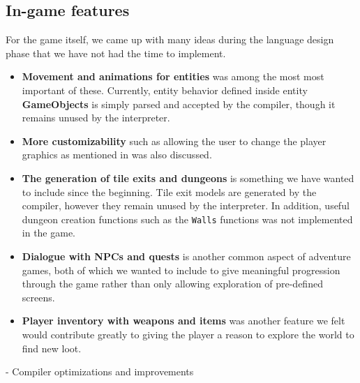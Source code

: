\subsection*{In-game features}
For the game itself, we came up with many ideas during the language design phase that we have not had the time to implement. 
\begin{itemize}
  \item
    \textbf{Movement and animations for entities} was among the most most important of these. 
    Currently, entity behavior defined inside entity \textbf{GameObjects} is simply parsed and accepted by the compiler, though it remains unused by the interpreter. 
  \item
      \textbf{More customizability} such as allowing the user to change the player graphics as mentioned in  was also discussed.
  \item 
    \textbf{The generation of tile exits and dungeons} is something we have wanted to include since the beginning. Tile exit models are generated by the compiler, however they remain unused by the interpreter. In addition, useful dungeon creation functions such as the \texttt{Walls} functions was not implemented in the game.
  \item
    \textbf{Dialogue with NPCs and quests} is another common aspect of adventure games, both of which we wanted to include to give meaningful progression through the game rather than only allowing exploration of pre-defined screens. 
  \item 
    \textbf{Player inventory with weapons and items} was another feature we felt would contribute greatly to giving the player a reason to explore the world to find new loot.
\end{itemize}




- Compiler optimizations and improvements